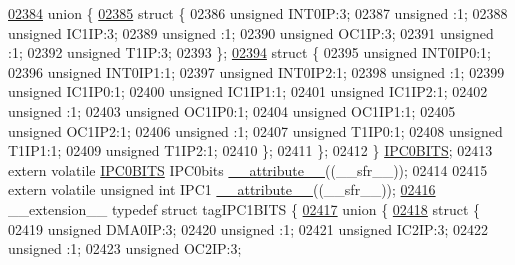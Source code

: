 \begin{DoxyCode}
\hypertarget{a00009_source_l02384}{}\hyperlink{a00009}{02384}   \textcolor{keyword}{union }\{
\hypertarget{a00009_source_l02385}{}\hyperlink{a00009}{02385}     \textcolor{keyword}{struct }\{
02386       \textcolor{keywordtype}{unsigned} INT0IP:3;
02387       \textcolor{keywordtype}{unsigned} :1;
02388       \textcolor{keywordtype}{unsigned} IC1IP:3;
02389       \textcolor{keywordtype}{unsigned} :1;
02390       \textcolor{keywordtype}{unsigned} OC1IP:3;
02391       \textcolor{keywordtype}{unsigned} :1;
02392       \textcolor{keywordtype}{unsigned} T1IP:3;
02393     \};
\hypertarget{a00009_source_l02394}{}\hyperlink{a00009}{02394}     \textcolor{keyword}{struct }\{
02395       \textcolor{keywordtype}{unsigned} INT0IP0:1;
02396       \textcolor{keywordtype}{unsigned} INT0IP1:1;
02397       \textcolor{keywordtype}{unsigned} INT0IP2:1;
02398       \textcolor{keywordtype}{unsigned} :1;
02399       \textcolor{keywordtype}{unsigned} IC1IP0:1;
02400       \textcolor{keywordtype}{unsigned} IC1IP1:1;
02401       \textcolor{keywordtype}{unsigned} IC1IP2:1;
02402       \textcolor{keywordtype}{unsigned} :1;
02403       \textcolor{keywordtype}{unsigned} OC1IP0:1;
02404       \textcolor{keywordtype}{unsigned} OC1IP1:1;
02405       \textcolor{keywordtype}{unsigned} OC1IP2:1;
02406       \textcolor{keywordtype}{unsigned} :1;
02407       \textcolor{keywordtype}{unsigned} T1IP0:1;
02408       \textcolor{keywordtype}{unsigned} T1IP1:1;
02409       \textcolor{keywordtype}{unsigned} T1IP2:1;
02410     \};
02411   \};
02412 \} \hyperlink{a00008_da/def/a00513}{IPC0BITS};
02413 \textcolor{keyword}{extern} \textcolor{keyword}{volatile} \hyperlink{a00008_da/def/a00513}{IPC0BITS} IPC0bits \hyperlink{a00009_a493c46f03454991ccc5aa7a6e1dfb2a7}{\_\_attribute\_\_}((\_\_sfr\_\_));
02414 
02415 \textcolor{keyword}{extern} \textcolor{keyword}{volatile} \textcolor{keywordtype}{unsigned} \textcolor{keywordtype}{int}  IPC1 \hyperlink{a00009_a493c46f03454991ccc5aa7a6e1dfb2a7}{\_\_attribute\_\_}((\_\_sfr\_\_));
\hypertarget{a00009_source_l02416}{}\hyperlink{a00008}{02416} \_\_extension\_\_ \textcolor{keyword}{typedef} \textcolor{keyword}{struct }tagIPC1BITS \{
\hypertarget{a00009_source_l02417}{}\hyperlink{a00009}{02417}   \textcolor{keyword}{union }\{
\hypertarget{a00009_source_l02418}{}\hyperlink{a00009}{02418}     \textcolor{keyword}{struct }\{
02419       \textcolor{keywordtype}{unsigned} DMA0IP:3;
02420       \textcolor{keywordtype}{unsigned} :1;
02421       \textcolor{keywordtype}{unsigned} IC2IP:3;
02422       \textcolor{keywordtype}{unsigned} :1;
02423       \textcolor{keywordtype}{unsigned} OC2IP:3;

\end{DoxyCode}
